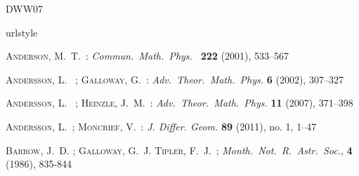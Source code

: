 \documentclass[a4paper,10pt]{article}
\theoremstyle{plain}
\theoremstyle{definition}
\theoremstyle{remark}
\theoremstyle{plain}
\newcommand{\eq}[1]{\begin{equation}#1\end{equation}}
\numberwithin{equation}{section}
\begin{document}
%
%
%	
	 	
	
 \begin{thebibliography}{DWW07}


\providecommand{\url}[1]{\texttt{#1}}
\expandafter\ifx\csname urlstyle\endcsname\relax
  \providecommand{\doi}[1]{doi: #1}\else
  \providecommand{\doi}{doi: \begingroup \urlstyle{rm}\Url}\fi

\textsc{Anderson}, M.~T.~:
\emph{Commun.~Math.~Phys.~} \textbf{222} (2001), 533--567

\textsc{Andersson}, L.~ ; \textsc{Galloway}, G.~:
\emph{Adv.~Theor.~Math.~Phys.} \textbf{6} (2002), 307--327

\textsc{Andersson}, L.~ ; \textsc{Heinzle}, J.~M.~:
\emph{Adv.~Theor.~Math.~Phys.} \textbf{11} (2007), 371--398




\textsc{Andersson}, L.~; \textsc{Moncrief}, V.~:
\emph{J. Differ. Geom.} \textbf{89} (2011), no. 1, 1--47



\textsc{Barrow}, J.~D. ; \textsc{Galloway}, G.~J. \textsc{Tipler}, F.~J.~;
\emph{Month.~Not.~R.~Astr.~Soc.}, \textbf{4} (1986), 835-844




\end{thebibliography}
\end{document}
